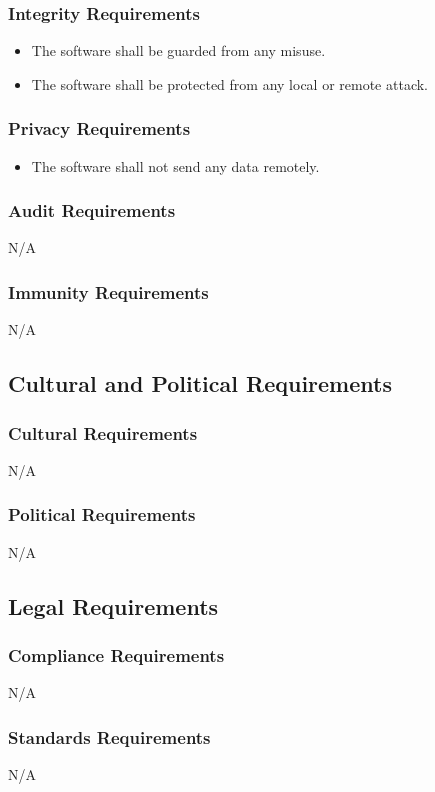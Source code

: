 \documentclass[12pt]{article}
\begin{document}
\subsubsection{Integrity Requirements}
\begin{itemize}
\item The software shall be guarded from any misuse.\\
\item The software shall be protected from any local or remote attack.
\end{itemize}

\subsubsection{Privacy Requirements}
\begin{itemize}
\item The software shall not send any data remotely.
\end{itemize}

\subsubsection{Audit Requirements}
N/A

\subsubsection{Immunity Requirements}
N/A

\subsection{Cultural and Political Requirements}
\subsubsection{Cultural Requirements}
N/A
\subsubsection{Political Requirements}
N/A

\subsection{Legal Requirements}
\subsubsection{Compliance Requirements}
N/A
\subsubsection{Standards Requirements}
N/A
\end{document}
